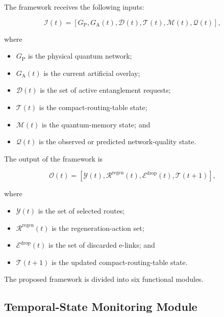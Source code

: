The framework receives the following inputs:

\begin{equation}
    \mathcal{I}(t)
    =
    \left[
    G_{\mathrm{P}},
    G_{\mathrm{A}}(t),
    \mathcal{D}(t),
    \mathcal{T}(t),
    \mathcal{M}(t),
    \mathcal{Q}(t)
    \right],
\end{equation}

where

\begin{itemize}
    \item $G_{\mathrm{P}}$ is the physical quantum network;
    \item $G_{\mathrm{A}}(t)$ is the current artificial overlay;
    \item $\mathcal{D}(t)$ is the set of active entanglement requests;
    \item $\mathcal{T}(t)$ is the compact-routing-table state;
    \item $\mathcal{M}(t)$ is the quantum-memory state; and
    \item $\mathcal{Q}(t)$ is the observed or predicted network-quality state.
\end{itemize}

The output of the framework is

\begin{equation}
    \mathcal{O}(t)
    =
    \left[
    \mathcal{Y}(t),
    \mathcal{R}^{\mathrm{regen}}(t),
    \mathcal{E}^{\mathrm{drop}}(t),
    \mathcal{T}(t+1)
    \right],
\end{equation}

where

\begin{itemize}
    \item $\mathcal{Y}(t)$ is the set of selected routes;
    \item $\mathcal{R}^{\mathrm{regen}}(t)$ is the regeneration-action set;
    \item $\mathcal{E}^{\mathrm{drop}}(t)$ is the set of discarded e-links; and
    \item $\mathcal{T}(t+1)$ is the updated compact-routing-table state.
\end{itemize}

The proposed framework is divided into six functional modules.

\subsection{Temporal-State Monitoring Module}

